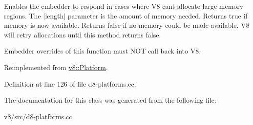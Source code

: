 Enables the embedder to respond in cases where V8 can\textquotesingle{}t allocate large memory regions. The $\vert$length$\vert$ parameter is the amount of memory needed. Returns true if memory is now available. Returns false if no memory could be made available. V8 will retry allocations until this method returns false.

Embedder overrides of this function must N\+OT call back into V8. 

Reimplemented from \mbox{\hyperlink{classv8_1_1Platform_a0de4b8a7bb8865ce65beb5afbaabe4cc}{v8\+::\+Platform}}.



Definition at line 126 of file d8-\/platforms.\+cc.



The documentation for this class was generated from the following file\+:\begin{DoxyCompactItemize}
\item 
v8/src/d8-\/platforms.\+cc\end{DoxyCompactItemize}
